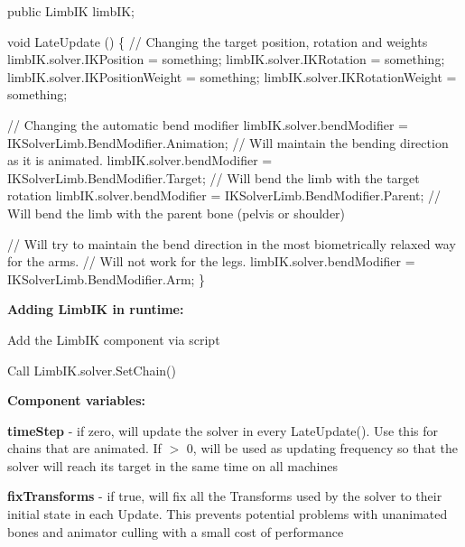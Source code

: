 \begin{DoxyCode}
\textcolor{keyword}{public} LimbIK limbIK;

\textcolor{keywordtype}{void} LateUpdate () \{
    \textcolor{comment}{// Changing the target position, rotation and weights}
    limbIK.solver.IKPosition = something;
    limbIK.solver.IKRotation = something;
    limbIK.solver.IKPositionWeight = something;
    limbIK.solver.IKRotationWeight = something;

    \textcolor{comment}{// Changing the automatic bend modifier}
    limbIK.solver.bendModifier = IKSolverLimb.BendModifier.Animation; \textcolor{comment}{// Will maintain the bending
       direction as it is animated.}
    limbIK.solver.bendModifier = IKSolverLimb.BendModifier.Target; \textcolor{comment}{// Will bend the limb with the target
       rotation}
    limbIK.solver.bendModifier = IKSolverLimb.BendModifier.Parent; \textcolor{comment}{// Will bend the limb with the parent
       bone (pelvis or shoulder)}

    \textcolor{comment}{// Will try to maintain the bend direction in the most biometrically relaxed way for the arms. }
    \textcolor{comment}{// Will not work for the legs.}
    limbIK.solver.bendModifier = IKSolverLimb.BendModifier.Arm; 
\}
\end{DoxyCode}


{\bfseries Adding Limb\+IK in runtime\+:}
\begin{DoxyItemize}
\item Add the Limb\+IK component via script
\item Call Limb\+I\+K.\+solver.\+Set\+Chain()
\end{DoxyItemize}



{\bfseries Component variables\+:}
\begin{DoxyItemize}
\item {\bfseries time\+Step} -\/ if zero, will update the solver in every Late\+Update(). Use this for chains that are animated. If $>$ 0, will be used as updating frequency so that the solver will reach its target in the same time on all machines
\item {\bfseries fix\+Transforms} -\/ if true, will fix all the Transforms used by the solver to their initial state in each Update. This prevents potential problems with unanimated bones and animator culling with a small cost of performance
\end{DoxyItemize}

